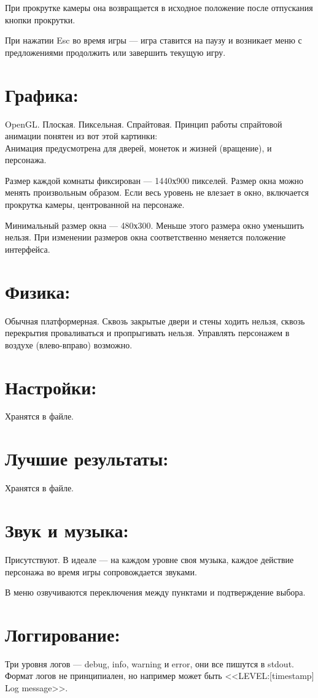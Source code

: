 \documentclass[12pt,a4paper,fullpage]{article}
\begin{document}
При прокрутке камеры она возвращается в исходное положение после отпускания кнопки прокрутки.

При нажатии Esc во время игры --- игра ставится на паузу и возникает меню с предложениями продолжить или завершить текущую игру.
\section{Графика:}
OpenGL. Плоская. Пиксельная. Спрайтовая. Принцип работы спрайтовой анимации понятен из вот этой картинки:\\
Анимация предусмотрена для дверей, монеток и жизней (вращение), и персонажа.

Размер каждой комнаты фиксирован --- 1440х900 пикселей. Размер окна можно менять произвольным образом. Если весь уровень не влезает в окно, включается прокрутка камеры, центрованной на персонаже.

Минимальный размер окна --- 480х300. Меньше этого размера окно уменьшить нельзя. При изменении размеров окна соответственно меняется положение интерфейса.
\section{Физика:}
Обычная платформерная. Сквозь закрытые двери и стены ходить нельзя, сквозь перекрытия проваливаться и пропрыгивать нельзя. Управлять персонажем в воздухе (влево-вправо) возможно.
\section{Настройки:}
Хранятся в файле.
\section{Лучшие результаты:}
Хранятся в файле.
\section{Звук и музыка:}
Присутствуют. В идеале --- на каждом уровне своя музыка, каждое действие персонажа во время игры сопровождается звуками.

В меню озвучиваются переключения между пунктами и подтверждение выбора.
\section{Логгирование:}
Три уровня логов --- debug, info, warning и error, они все пишутся в stdout. Формат логов не принципиален, но например может быть <<LEVEL:[timestamp] Log message>>.
\end{document}

